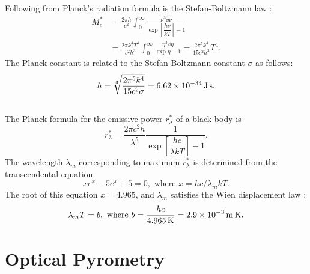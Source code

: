 Following from Planck's radiation formula is the Stefan-Boltzmann law :
\begin{align*}%
M_{e}^{*} & = \frac{2 \pi h}{c^{2}} \int_{0}^{\infty} \frac{\nu^{3} \dd \nu}{\exp \left[ \dfrac{h \nu}{kT}\right] -1}\\
& = \frac{2 \pi k^{4}T^{4}}{c^{2}h^{3}} \int_{0}^{\infty} \frac{\eta^{3} \dd \eta}{\exp \eta -1} = \frac{2 \pi^{5} k^{4}}{15 c^{2}h^{3}} T^{4}.
\end{align*}
The Planck constant is related to the Stefan-Boltzmann constant $\sigma$  as follows:
\begin{equation*}%
h = \sqrt[3]{\frac{2 \pi^{5}k^{4}}{15c^{2} \sigma}} = \SI{6.62d-34}{\joule\second}.
\end{equation*}

\subsection{}\label{36.3.4} The Planck formula for the emissive power $r_{\lambda}^{*}$ of a black-body is
\begin{equation*}%
r_{\lambda}^{*} = \frac{2 \pi c^{2}h}{\lambda^{5}} \frac{1}{\exp \left[ \dfrac{hc}{\lambda k T}\right] - 1}.
\end{equation*}
The wavelength $\lambda_{m}$ corresponding to maximum $r_{\lambda}^{*}$ is determined from the transcendental equation
\begin{equation*}%
xe^{x} - 5e^{x} + 5 = 0, \text{ where } x = hc/\lambda_{m}kT.
\end{equation*}
The root of this equation $x = 4.965$, and $\lambda_{m}$ satisfies the Wien displacement law :
\begin{equation*}%
\lambda_{m} T = b, \text{ where } b = \frac{hc}{\SI{4.965}{\kelvin}} = \SI{2.9d-3}{\meter\kelvin}.
\end{equation*}





\section{Optical Pyrometry}
\label{sec-36.4} 



